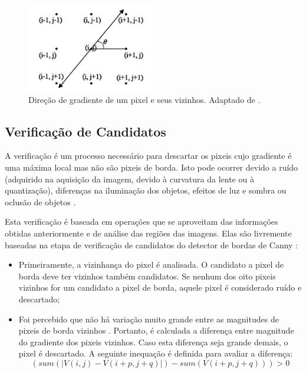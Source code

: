 \begin{figure} [h]
\centering
\includegraphics[width = 0.5\textwidth]{figuras/vizinh.jpg} 
\caption{Direção de gradiente de um pixel e seus vizinhos. Adaptado de \cite{mrf}.} \label{maxlocal}
\end{figure}

\subsection{Verificação de Candidatos} \label{met:bordaveri}

A verificação é um processo necessário para descartar os pixeis cujo gradiente é uma máxima local mas não são pixeis de borda. Isto pode ocorrer devido a ruído (adquirido na aquisição da imagem, devido à curvatura da lente ou à quantização), diferenças na iluminação dos objetos, efeitos de luz e sombra ou oclusão de objetos \cite{ruidocausas}.


Esta verificação é baseada em operações que se aproveitam das informações obtidas anteriormente e de análise das regiões das imagens. Elas são livremente baseadas na etapa de verificação de candidatos do detector de bordas de Canny \cite{canny}:


\begin{itemize}
\item Primeiramente, a vizinhança do pixel é analisada. O candidato a pixel de borda deve ter vizinhos também candidatos. Se nenhum dos oito pixeis vizinhos for um candidato a pixel de borda, aquele pixel é considerado ruído e descartado;
\item Foi percebido que não há variação muito grande entre as magnitudes de pixeis de borda vizinhos \cite{mrf}. Portanto, é calculada a diferença entre magnitude do gradiente dos pixeis vizinhos. Caso esta diferença seja grande demais, o pixel é descartado. A seguinte inequação é definida para avaliar a diferença:
\begin{equation}
(sum(| V(i,j) - V(i+p,j+q) |)- sum(V(i+p,j+q))) >0
\end{equation}


\end {itemize}

